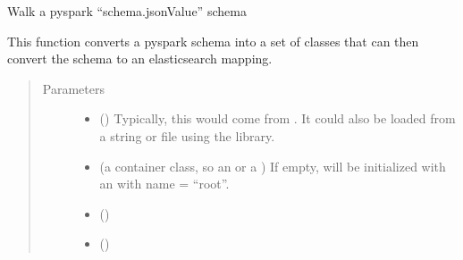 \documentclass[letterpaper,10pt,english]{sphinxmanual}
\begin{document}
\begin{fulllineitems}
\label{\detokenize{omicidx.schema_tools:omicidx.schema_tools.walk_schema}}
Walk a pyspark “schema.jsonValue” schema

This function converts a pyspark schema into
a set of classes that can then convert the schema
to an elasticsearch mapping.
\begin{quote}\begin{description}
\item[{Parameters}] \leavevmode\begin{itemize}
\item {} 
 () \textendash{} Typically, this would come from . It could
also be loaded from a string or file using the  library.

\item {} 
 (a container class, so an  or a ) \textendash{} If empty, will be initialized with an  with
name = “root”.

\item {} 
\sphinxstyleliteralstrong{\sphinxupquote{(}}\sphinxstyleliteralstrong{\sphinxupquote{(}}\sphinxstyleliteralstrong{\sphinxupquote{)}}\sphinxstyleliteralstrong{\sphinxupquote{, }}\sphinxstyleliteralstrong{\sphinxupquote{(}}\sphinxstyleliteralstrong{\sphinxupquote{)}}\sphinxstyleliteralstrong{\sphinxupquote{)}} (\sphinxstyleliteralemphasis{\sphinxupquote{\textgreater{}\textgreater{}\textgreater{}}}) \textendash{} 

\item {} 
\sphinxstyleliteralstrong{\sphinxupquote{(}}\sphinxstyleliteralstrong{\sphinxupquote{)}} (\sphinxstyleliteralemphasis{\sphinxupquote{\textgreater{}\textgreater{}\textgreater{}}}) \textendash{} 

\end{itemize}

\end{description}\end{quote}

\end{fulllineitems}
\end{document}
